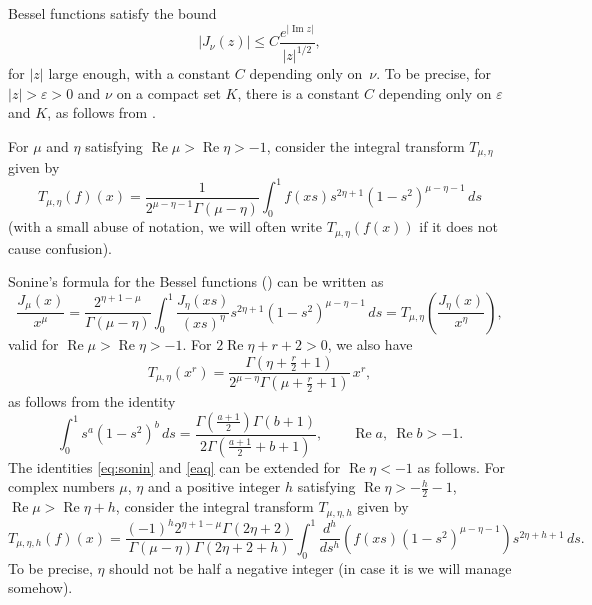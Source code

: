 \documentclass[10pt,leqno,a4paper]{article}
\theoremstyle{plain}
\renewcommand{\Im}{\operatorname{Im}}
\renewcommand{\Re}{\operatorname{Re}}
\numberwithin{equation}{section}
\begin{document}
Bessel functions satisfy the bound
\begin{equation}
\label{cotasupJ}
   |J_\nu(z)| \leq C \frac{e^{|\Im z|}}{|z|^{1/2}},
\end{equation}
for $|z|$ large enough, with a constant $C$ depending only on~$\nu$.
To be precise, for $|z| > \varepsilon > 0$ and $\nu$ on a compact set $K$, there is a constant $C$ depending only on $\varepsilon$ and $K$, as follows from \cite[\href{https://dlmf.nist.gov/10.4.E4}{(10.4.4)} and~\href{https://dlmf.nist.gov/10.17.iv}{\S\,10.17(iv)}]{DLMF}.

For $\mu$ and $\eta$ satisfying $\Re \mu>\Re \eta>-1$, consider the integral transform $T_{\mu,\eta}$ given by
\begin{equation}
\label{itc}
   T_{\mu,\eta}(f)(x) = \frac{1}{2^{\mu-\eta-1}\Gamma(\mu-\eta)}
   \int_0^1 f(xs) s^{2\eta+1} (1-s^2)^{\mu-\eta-1} \, ds
\end{equation}
(with a small abuse of notation, we will often write $T_{\mu,\eta}(f(x))$ if it does not cause confusion).

Sonine's formula for the Bessel functions (\cite[12.11(1), p.~373]{Wat}) can be written as
\begin{equation}
\label{eq:sonin}
   \frac{J_{\mu}(x)}{x^\mu} = \frac{2^{\eta+1-\mu}}{\Gamma(\mu-\eta)}
   \int_0^1 \frac{J_\eta(xs)}{(xs)^{\eta}} s^{2\eta+1} (1-s^2)^{\mu-\eta-1} \, ds
   = T_{\mu,\eta} \left(\frac{J_\eta(x)}{x^{\eta}}\right),
\end{equation}
valid for $\Re \mu > \Re \eta>-1$.
For $2\Re \eta+r+2>0$, we also have
\begin{equation}
\label{eaq}
   T_{\mu,\eta}(x^{r}) =
   \frac{\Gamma(\eta+\frac{r}{2}+1)}{2^{\mu-\eta} \Gamma(\mu+\frac{r}{2}+1)} \,x^{r},
\end{equation}
as follows from the identity
\[
   \int_0^1 s^{a}(1-s^2)^{b}\,ds
   = \frac{\Gamma(\frac{a+1}{2}) \Gamma(b+1)}{2 \Gamma(\frac{a+1}{2} + b + 1)},
   \qquad \Re a,\ \Re b >-1.
\]
The identities \eqref{eq:sonin} and \eqref{eaq} can be extended for $\Re \eta < -1$ as follows. For complex numbers $\mu$, $\eta$ and a positive integer $h$ satisfying $\Re \eta > - \frac{h}{2} - 1$, $\Re \mu>\Re \eta+h$, consider the integral transform $T_{\mu,\eta,h}$ given by
\begin{equation}
\label{itch}
   T_{\mu,\eta,h}(f)(x) = \frac{(-1)^h 2^{\eta+1-\mu}\Gamma(2\eta+2)}{\Gamma(\mu-\eta) \Gamma(2\eta+2+h)}
    \int_0^1 \frac{d^h}{ds^h}(f(xs)(1-s^2)^{\mu-\eta-1})
   s^{2\eta+h+1} \,ds.
\end{equation}
To be precise, $\eta$ should not be half a negative integer (in case it is we will manage somehow).
\end{document}
